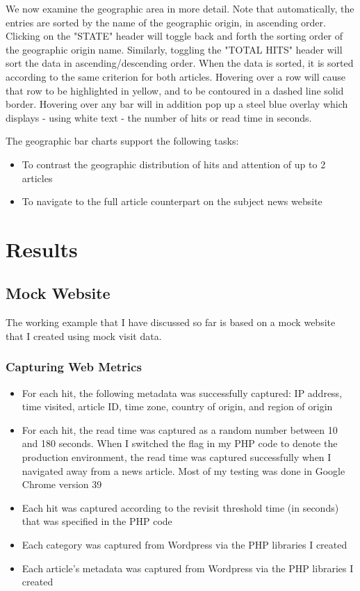 \documentclass[12pt]{article}
\begin{document}
\noindent We now examine the geographic area in more detail. Note that automatically, the entries are sorted by the name of the geographic origin, in ascending order. Clicking on the "STATE" header will toggle back and forth the sorting order of the geographic origin name. Similarly, toggling the "TOTAL HITS" header will sort the data in ascending/descending order. When the data is sorted, it is sorted according to the same criterion for both articles. Hovering over a row will cause that row to be highlighted in yellow, and to be contoured in a dashed line solid border. Hovering over any bar will in addition pop up a steel blue overlay which displays - using white text - the number of hits or read time in seconds.  

The geographic bar charts support the following tasks:
\begin{itemize}
\item To contrast the geographic distribution of hits and attention of up to 2 articles
\item To navigate to the full article counterpart on the subject news website
\end{itemize}

\newpage

\section{Results}

\subsection{Mock Website}
The working example that I have discussed so far is based on a mock website that I created using mock visit data.

\subsubsection{Capturing Web Metrics}
\begin{itemize}
\item For each hit, the following metadata was successfully captured: IP address, time visited, article ID, time zone, country of origin, and region of origin
\item For each hit, the read time was captured as a random number between 10 and 180 seconds. When I switched the flag in my PHP code to denote the production environment, the read time was captured successfully when I navigated away from a news article. Most of my testing was done in Google Chrome version 39
\item Each hit was captured according to the revisit threshold time (in seconds) that was specified in the PHP code
\item Each category was captured from Wordpress via the PHP libraries I created
\item Each article's metadata was captured from Wordpress via the PHP libraries I created
\end{itemize}
\end{document}
